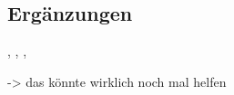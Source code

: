 \subsection{Erg\"anzungen}
\cite[S.38]{Bestle2012}, \cite[S.90]{GeorgRill2014}, \cite[S.87]{Schramm2010}, \hfill \newline

\cite[S.42]{Pfeiffer2014} -> das k\"onnte wirklich noch mal helfen \hfill \newline
